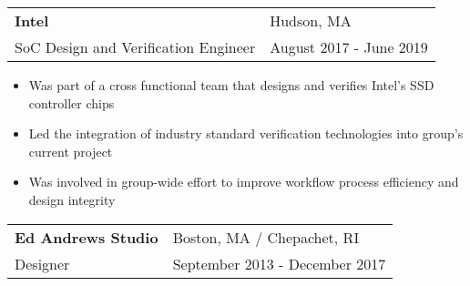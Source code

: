 \documentclass[11pt]{article}
\begin{document}
\begin{tabularx}{\textwidth}{l R}
{\bf Intel} & Hudson, MA\\ 
SoC Design and Verification Engineer & August 2017 - June 2019\\
\end{tabularx}  
\vspace{-0.5cm}
\begin{itemize}[noitemsep]
\item
Was part of a cross functional team that designs and verifies Intel's SSD controller chips
\item
Led the integration of industry standard verification technologies into group's current project
\item
Was involved in group-wide effort to improve workflow process efficiency and design integrity
\end{itemize}
\vspace{0.25cm}
\begin{tabularx}{\textwidth}{l R}
{\bf Ed Andrews Studio} & Boston, MA / Chepachet, RI\\ 
Designer & September 2013 - December 2017\\
\end{tabularx}  
\end{document}
